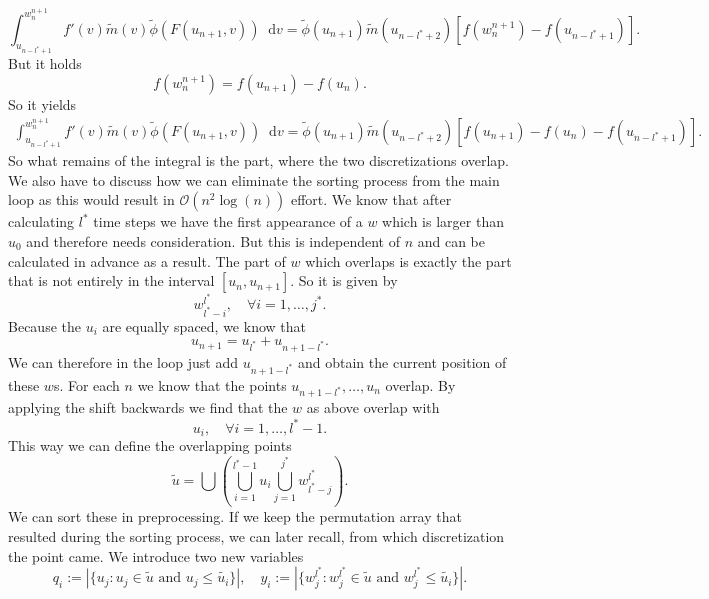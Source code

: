 \documentclass[12pt,a4paper,twoside, open=right]{scrreprt}
\theoremstyle{definition}
\theoremstyle{plain}
\newcommand{\abs}[1]{\left\vert #1\right\vert}
\newcommand{\D}{\mathop{}\!\mathrm{d}}
\begin{document}
\begin{equation}
    \int_{u_{n-l^*+1}}^{w^{n+1}_n}f'(v)\tilde{m}(v)\tilde{\phi}(F(u_{n+1},v))\D v = \tilde\phi(u_{n+1})\tilde{m}(u_{n-l^*+2})[f(w^{n+1}_n)-f(u_{n-l^*+1})].
\end{equation}
But it holds
\begin{equation}
    f(w^{n+1}_n)=f(u_{n+1})-f(u_n).
\end{equation}
So it yields
\begin{align}
     \int_{u_{n-l^*+1}}^{w^{n+1}_n}f'(v)\tilde{m}(v)\tilde{\phi}(F(u_{n+1},v))\D v = \tilde\phi(u_{n+1})\tilde{m}(u_{n-l^*+2})[f(u_{n+1})-f(u_n)-f(u_{n-l^*+1})].
\end{align}
So what remains of the integral is the part, where the two discretizations overlap. We also have to discuss how we can eliminate the sorting process from the main loop as this would result in $\mathcal{O}(n^2\log(n))$ effort. We know that after calculating $l^*$ time steps we have the first appearance of a $w$ which is larger than $u_0$ and therefore needs consideration. But this is independent of $n$ and can be calculated in advance as a result. The part of $w$ which overlaps is exactly the part that is not entirely in the interval $[u_n,u_{n+1}]$. So it is given by
\begin{equation}
    w^{l^*}_{l^*-i},\quad\forall i=1,\dotsc,j^*.
\end{equation}
Because the $u_i$ are equally spaced, we know that
\begin{equation}
    u_{n+1}=u_{l^*}+u_{n+1-l^*}.
\end{equation}
We can therefore in the loop just add $u_{n+1-l^*}$ and obtain the current position of these $w$s. For each $n$ we know that the points $u_{n+1-l^*},\dotsc,u_n$ overlap. By applying the shift backwards we find that the $w$ as above overlap with 
\begin{equation}
    u_i,\quad\forall i=1,\dotsc,l^*-1.
\end{equation}
This way we can define the overlapping points 
\begin{equation}
    \tilde{u}= \bigcup\left(\bigcup_{i=1}^{l^*-1}u_i\bigcup_{j=1}^{j^*}w^{l^*}_{l^*-j}\right).
\end{equation}
We can sort these in preprocessing. If we keep the permutation array that resulted during the sorting process, we can later recall, from which discretization the point came. We introduce two new variables
\begin{equation}
    q_i:=\abs{\{u_j\colon u_j\in\tilde{u} \text{ and }u_j\le\tilde{u_i} \}},\quad
    y_i:=\abs{\{w^{l^*}_j\colon w^{l^*}_j\in\tilde{u} \text{ and }w^{l^*}_j\le\tilde{u_i} \}}.
\end{equation}
\end{document}
